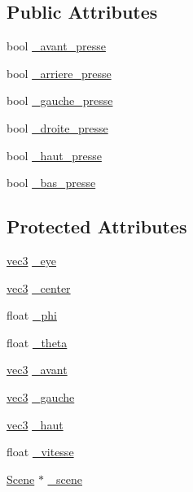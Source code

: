 \subsection*{Public Attributes}
\begin{DoxyCompactItemize}
\item 
bool \hyperlink{class_camera_a4cab15e35a96fdcb2a8599fea13a9b8f}{\+\_\+avant\+\_\+presse}
\item 
bool \hyperlink{class_camera_a0ce12f74953fcd53192e48f8b4164e2e}{\+\_\+arriere\+\_\+presse}
\item 
bool \hyperlink{class_camera_ac2a5c37c4f9603a14e3616d6a75f7998}{\+\_\+gauche\+\_\+presse}
\item 
bool \hyperlink{class_camera_a61b2e438537b99ba1f0a97e5586b7f45}{\+\_\+droite\+\_\+presse}
\item 
bool \hyperlink{class_camera_a43b59b53cb182906d56e6e4d2c31139c}{\+\_\+haut\+\_\+presse}
\item 
bool \hyperlink{class_camera_aaba6828f97c9ef07b6b135a665bd3008}{\+\_\+bas\+\_\+presse}
\end{DoxyCompactItemize}
\subsection*{Protected Attributes}
\begin{DoxyCompactItemize}
\item 
\hyperlink{structvec3}{vec3} \hyperlink{class_camera_ad4c22c27bd247f4411c4166220ba6e82}{\+\_\+eye}
\item 
\hyperlink{structvec3}{vec3} \hyperlink{class_camera_ad80a82cbc81e6d8ba04c7cc1ac7ba0d7}{\+\_\+center}
\item 
float \hyperlink{class_camera_a288df53a3ff446ee4367ee47b8499fcd}{\+\_\+phi}
\item 
float \hyperlink{class_camera_aeb3c859c3c254c8296420451259e5629}{\+\_\+theta}
\item 
\hyperlink{structvec3}{vec3} \hyperlink{class_camera_ab7cf8c1eae6b2f35a20e8abd1f0570c9}{\+\_\+avant}
\item 
\hyperlink{structvec3}{vec3} \hyperlink{class_camera_aaf97dba7663b99065d8d508b589224de}{\+\_\+gauche}
\item 
\hyperlink{structvec3}{vec3} \hyperlink{class_camera_af860db197a7abbf0284df4e32a95a347}{\+\_\+haut}
\item 
float \hyperlink{class_camera_a9062fdde515a49bf8db963ac46be9942}{\+\_\+vitesse}
\item 
\hyperlink{class_scene}{Scene} $\ast$ \hyperlink{class_camera_a81ffb00eedbaefbfb755b0c13d42180a}{\+\_\+scene}
\end{DoxyCompactItemize}
